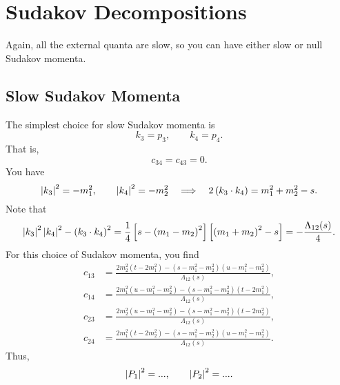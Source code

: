 \section{Sudakov Decompositions}
Again, all the external quanta are slow, so you can have either slow or null Sudakov momenta.
\subsection{Slow Sudakov Momenta}
The simplest choice for slow Sudakov momenta is
\begin{equation}
	k_{3} = p_{3}, \qquad k_{4} = p_{4}.
\end{equation}
That is,
\begin{equation}
	c_{34} = c_{43} = 0.
\end{equation}
You have
\begin{equation}
	\left\lvert k_{3} \right\rvert^{2} = -m_{1}^{2}, \qquad \left\lvert k_{4} \right\rvert^{2} = -m_{2}^{2} \quad \Longrightarrow \quad 2\left( k_{3} \cdot k_{4} \right) = m_{1}^{2} + m_{2}^{2} - s.
\end{equation}
Note that
\begin{equation}
	\left\lvert k_{3} \right\rvert^{2} \left\lvert k_{4} \right\rvert^{2} - \left( k_{3} \cdot k_{4} \right)^{2} = \frac{1}{4} \left[ s - \left( m_{1} - m_{2} \right)^{2} \right] \left[ \left( m_{1} + m_{2} \right)^{2} - s \right] = - \frac{\Lambda_{12}(s)}{4}.
\end{equation}
For this choice of Sudakov momenta, you find
\begin{align}
	c_{13} &= \frac{2 m_{2}^{2} \left(t - 2m_{1}^{2} \right) - \left(s - m_{1}^{2} - m_{2}^{2} \right) \left(u - m_{1}^{2} - m_{2}^{2} \right) }{\Lambda_{12}(s)}, \\
	c_{14} &= \frac{2 m_{1}^{2} \left(u - m_{1}^{2} - m_{2}^{2} \right) - \left(s - m_{1}^{2} - m_{2}^{2} \right) \left(t - 2m_{1}^{2} \right) }{\Lambda_{12}(s)}, \\
	c_{23} &= \frac{2 m_{2}^{2} \left(u - m_{1}^{2} - m_{2}^{2} \right) - \left(s - m_{1}^{2} - m_{2}^{2} \right) \left(t - 2m_{2}^{2} \right) }{\Lambda_{12}(s)}, \\
	c_{24} &= \frac{2 m_{1}^{2} \left(t - 2m_{2}^{2} \right) - \left(s - m_{1}^{2} - m_{2}^{2} \right) \left(u - m_{1}^{2} - m_{2}^{2} \right) }{\Lambda_{12}(s)}.
\end{align}
Thus,
\begin{equation}
	\left\lvert P_{1} \right\rvert^{2} = ..., \qquad \left\lvert P_{2} \right\rvert^{2} = ....
\end{equation}
